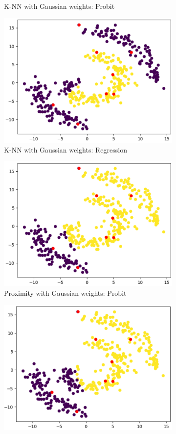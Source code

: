 \documentclass[12pt]{amsart}
\begin{document}
\begin{figure}[ht]
\begin{subfigure}{0.475\linewidth}
    \caption{K-NN with Gaussian weights: Probit} 
    \label{Fig:SpiKNNRBFPro} 
  \end{subfigure} 
      \begin{subfigure}{0.475\linewidth}
    \centering
    \includegraphics[width=0.8\linewidth]{Figures/SpiKNNRBFReg.png} 
    \caption{K-NN with Gaussian weights: Regression} 
    \label{Fig:SpiKNNRBFReg} 
  \end{subfigure}
      \begin{subfigure}{0.475\linewidth}
    \centering
    \includegraphics[width=0.8\linewidth]{Figures/SpiProxPro.png} 
    \caption{Proximity with Gaussian weights: Probit} 
    \label{Fig:SpiProxPro} 
  \end{subfigure}
      \begin{subfigure}{0.475\linewidth}
    \centering
    \includegraphics[width=0.8\linewidth]{Figures/SpiProxReg.png} 

\end{subfigure}
\end{figure}
\end{document}
